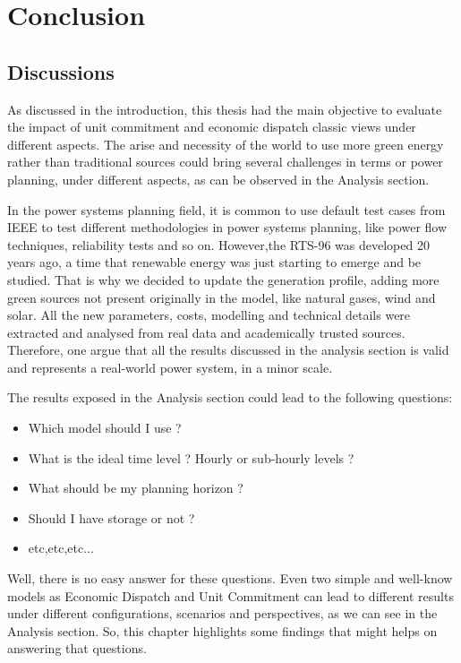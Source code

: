\documentclass[12pt,LUDisStyle,twosided]{book}
\begin{document}
\chapter{Conclusion}

\section{Discussions}

As discussed in the introduction, this thesis had the main objective to evaluate the impact of unit commitment and economic dispatch classic views under different aspects. The arise and necessity of the world to use more green energy rather than traditional sources could bring several challenges in terms or power planning, under different aspects, as can be observed in the Analysis section. 

In the power systems planning field, it is common to use default test cases from IEEE to test different methodologies in power systems planning, like power flow techniques, reliability tests and so on. However,the RTS-96 was developed 20 years ago, a time that renewable energy was just starting to emerge and be studied. That is why we decided to update the generation profile, adding more green sources not present originally in the model, like natural gases, wind and solar. All the new parameters, costs, modelling and technical details were extracted and analysed from real data and academically trusted sources. Therefore, one argue that all the results discussed in the analysis section is valid and represents a real-world power system, in a minor scale.

The results exposed in the Analysis section could lead to the following questions:

\begin{itemize}
\item Which model should I use ?
\item What is the ideal time level ? Hourly or sub-hourly levels ?
\item What should be my planning horizon ?
\item Should I have storage or not ?
\item etc,etc,etc...
\end{itemize}

Well, there is no easy answer for these questions. Even two simple and well-know models as Economic Dispatch and Unit Commitment can lead to different results under different configurations, scenarios and perspectives, as we can see in the Analysis section. So, this chapter highlights some findings that might helps on answering that questions.
\end{document}
